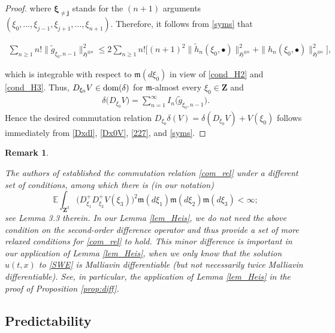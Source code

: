 \documentclass[letterpaper, 11pt,  reqno]{amsart}
\newtheorem{remark}[theorem]{Remark}
\newcommand{\noi}{\noindent}
\newcommand{\bul}{\bullet}
\newcommand{\E}{\mathbb{E}}
\newcommand{\dl}{\delta}
\newcommand{\wt}{\widetilde}
\newcommand{\fm}{\mathfrak{m}}
\newcommand{\fH}{\mathfrak{H}}
\newcommand{\dom}{\textup{dom}}
\numberwithin{equation}{section}
\numberwithin{theorem}{section}
\begin{document}
\begin{proof}
 
 
 
 
 
 \noi
 where 
 $\pmb{\xi_{\neq j}}$ stands for the $(n+1)$ arguments 
 $(\xi_0, ...,  \xi_{j-1},\xi_{j+1}, ...,  \xi_{n+1})$.
 Therefore, it follows from \eqref{syms} that 
 
 \noi
 \begin{align*}
 \sum_{n\geq 1} n! \| \wt  g_{\xi_0, n-1} \|^2_{\fH^{\otimes n}}
 \leq 
 2  \sum_{n\geq 1} n! 
 \Big[   (n+1)^2 \|  \wt{h}_{n}(\xi_0, \bul) \|^2_{\fH^{\otimes n}}
  + \| h_{n}(\xi_0, \bul) \|^2_{\fH^{\otimes n}} \Big]   ,
 \end{align*}
 
 \noi
 which is integrable with respect to $\fm(d\xi_0)$ in view of \eqref{cond_H2} and \eqref{cond_H3}.
 Thus, $D_{\xi_0} V\in\dom(\dl)$
 for $\fm$-almost every $\xi_0\in\mathbf{Z}$ and
 \begin{align}\label{Dx0V}
 \dl\big( D_{\xi_0}V \big) = \sum_{n=1}^\infty I_n\big( \wt  g_{\xi_0, n-1}  \big).
 \end{align}
Hence the desired commutation relation $D_{\xi_0} \dl(V) = \dl( D_{\xi_0}V) + V(\xi_0)$
follows immediately 
from \eqref{Dxdl}, \eqref{Dx0V}, \eqref{227}, and \eqref{syms}. \qedhere
 
\end{proof}


\begin{remark}\rm \label{rem_LMS}
 
The authors of   \cite{LMS23} established the  commutation relation \eqref{com_rel} 
under a different set of conditions, among which 
there is (in our notation)
\[
\E \int_{\mathbf{Z}^3} \big( D^+_{\xi_1}  D^+_{\xi_2} V(\xi_3) \big)^2 \fm(d\xi_1) \fm(d\xi_2) \fm(d\xi_3)  <\infty;
\]
see Lemma 3.3 therein. 
In our Lemma \ref{lem_Heis}, we do not need the above condition 
on the second-order difference  operator  and thus provide 
a set of  more relaxed conditions for  \eqref{com_rel} to hold. 
This minor difference is important
 in our application of Lemma \ref{lem_Heis},
when we only know that  the solution $u(t,x)$ to \eqref{SWE} is Malliavin differentiable
(but not necessarily  twice Malliavin differentiable).
See, in particular, the application of Lemma \ref{lem_Heis}
in the proof of Proposition \ref{prop:diff}.
  
\end{remark}




 

\subsection{Predictability}\label{SEC2_3}
\end{document}
